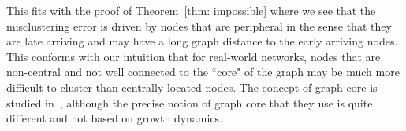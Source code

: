\documentclass[twoside,11pt]{article}
\theoremstyle{remark}
\begin{document}


This fits with the proof of Theorem~\ref{thm: impossible} where we see that the misclustering error is driven by nodes that are peripheral in the sense that they are late arriving and may have a long graph distance to the early arriving nodes. This conforms with our intuition that for real-world networks, nodes that are non-central and not well connected to the ``core" of the graph may be much more difficult to cluster than centrally located nodes. The concept of graph core is studied in~\cite{zhang2015identification,naik2021sparse,miao2023informative,yanchenko2025statistical}, although the precise notion of graph core that they use is quite different and not based on growth dynamics.


\end{document}
